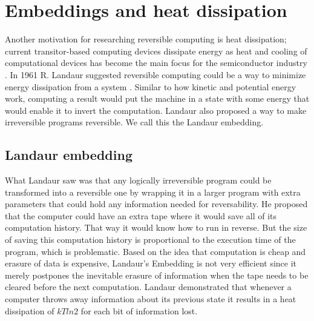 

\section{Embeddings and heat dissipation}
Another motivation for researching reversible computing is heat dissipation; current transitor-based computing devices dissipate energy as heat and cooling of computational devices has become the main focus for the semiconductor industry \cite{semiconductors_valley}. In 1961 R. Landaur suggested reversible computing could be a way to minimize energy dissipation from a system \cite{Irreversibility_paper}.
Similar to how kinetic and potential energy work, computing a result would put the machine in a state with some energy that would enable it to invert the computation.
Landaur also proposed a way to make irreversible programs reversible. We call this the Landaur embedding.


\subsection{Landaur embedding}
What Landaur saw was that any logically irreversible program could be transformed into a reversible one by wrapping it in a larger program with extra parameters that could hold any information needed for reversability. He proposed that the computer could have an extra tape where it would save all of its computation history. That way it would know how to run in reverse. But the size of saving this computation history is proportional to the execution time of the program, which is problematic.
Based on the idea that computation is cheap and erasure of data is expensive, Landaur's Embedding is not very efficient since it merely postpones the inevitable erasure of information when the tape needs to be cleared before the next computation.
Landaur demonstrated that whenever a computer throws away information about its previous state it results in a heat dissipation of $kT ln 2$ for each bit of information lost.
